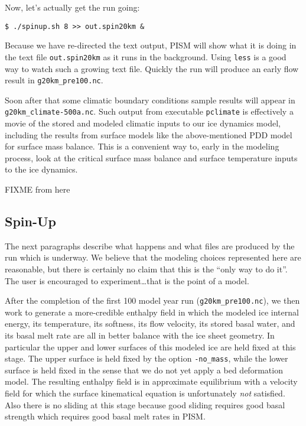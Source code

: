 Now, let's actually get the run going:
\begin{verbatim}
$ ./spinup.sh 8 >> out.spin20km &
\end{verbatim}
\noindent Because we have re-directed the text output, PISM will show what it is doing in the text file \texttt{out.spin20km} as it runs in the background.  Using \texttt{less} is a good way to watch such a growing text file.  Quickly the run will produce an early flow result in \texttt{g20km_pre100.nc}.

Soon after that some climatic boundary conditions sample results will appear in \texttt{g20km_climate-500a.nc}.  Such output from executable \texttt{pclimate} is effectively a movie of the stored and modeled climatic inputs to our ice dynamics model, including the results from surface models like the above-mentioned PDD model for surface mass balance.  This is a convenient way to, early in the modeling process, look at the critical surface mass balance and surface temperature inputs to the ice dynamics.

FIXME from here

\subsection{Spin-Up}  \label{subsect:spinupsketch}  The next paragraphs describe what happens and what files are produced by the run which is underway.  We believe that the modeling choices represented here are reasonable, but there is certainly no claim that this is the ``only way to do it''.  The user is encouraged to experiment\dots that is the point of a model.

After the completion of the first 100 model year run (\texttt{g20km_pre100.nc}), we then work to generate a more-credible enthalpy field in which the modeled ice internal energy, its temperature, its softness, its flow velocity, its stored basal water, and its basal melt rate are all in better balance with the ice sheet geometry.  In particular the upper and lower surfaces of this modeled ice are held fixed at this stage.  The upper surface is held fixed by the option \texttt{-no_mass}, while the lower surface is held fixed in the sense that we do not yet apply a bed deformation model.  The resulting enthalpy field is in approximate equilibrium with a velocity field for which the surface kinematical equation \cite{Fowler} is unfortunately \emph{not} satisfied.  Also there is no sliding at this stage because good sliding requires good basal strength which requires good basal melt rates in PISM.

